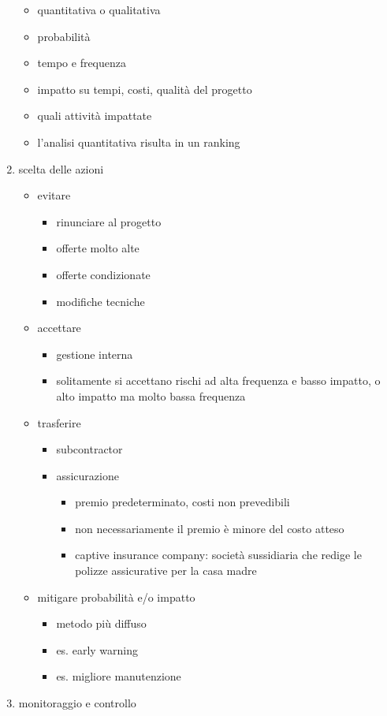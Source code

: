 \documentclass[answers, a4paper, 11pt]{exam}
\begin{document}
\begin{enumerate}
    \begin{itemize}
        \item quantitativa o qualitativa
        \item probabilità
        \item tempo e frequenza
        \item impatto su tempi, costi, qualità del progetto
        \item quali attività impattate
        \item l'analisi quantitativa risulta in un ranking
    \end{itemize}
    \item scelta delle azioni
    \begin{itemize}
        \item evitare
        \begin{itemize}
            \item rinunciare al progetto
            \item offerte molto alte
            \item offerte condizionate
            \item modifiche tecniche
        \end{itemize}
        \item accettare
        \begin{itemize}
            \item gestione interna
            \item solitamente si accettano rischi ad alta frequenza e basso impatto, o alto impatto ma molto bassa frequenza 
        \end{itemize}
        \item trasferire
        \begin{itemize}
            \item subcontractor
            \item assicurazione
            \begin{itemize}
                \item premio predeterminato, costi non prevedibili
                \item non necessariamente il premio è minore del costo atteso
                \item captive insurance company: società sussidiaria che redige le polizze assicurative per la casa madre
            \end{itemize}
        \end{itemize}
        \item mitigare probabilità e/o impatto
        \begin{itemize}
            \item metodo più diffuso
            \item es. early warning
            \item es. migliore manutenzione
        \end{itemize}
    \end{itemize}
    \item monitoraggio e controllo
\end{enumerate}
\end{document}
